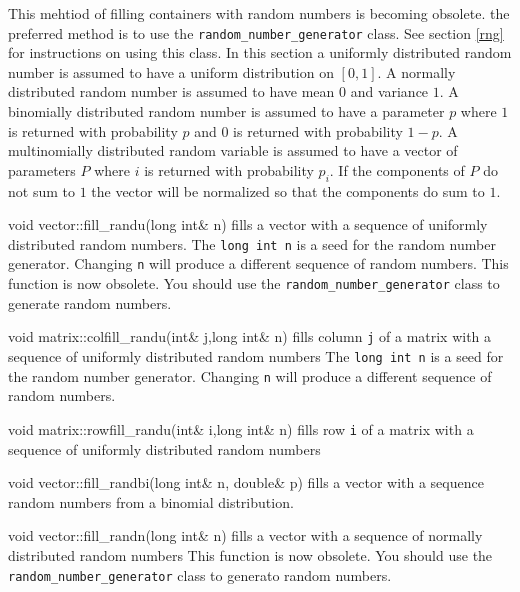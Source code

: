 This mehtiod of filling containers with random numbers is becoming
obsolete. the preferred method is to use the
{\tt random\_number\_generator} class.
See section \ref{rng} for instructions on using this class.
In this section a uniformly distributed random number is assumed to have
a uniform distribution on $[0,1]$. A normally distributed random number
is assumed to have mean $0$ and variance $1$.
A binomially distributed random number is assumed to have a parameter $p$
where $1$ is returned with probability $p$ and $0$ is returned with
probability $1-p$.
A multinomially distributed random variable is assumed to have a vector
of parameters $P$ where $i$ is returned with probability $p_i$.
If the components of $P$ do not sum to $1$ the vector will be normalized
so that the components do sum to $1$.

  
\beginexample
void vector::fill_randu(long int& n)
\endexample
\noindent fills a vector with a sequence of uniformly distributed 
random numbers. The {\tt long int n} is a seed for the random number
generator. Changing {\tt n} will produce a different sequence of
random numbers. 
This function is now obsolete. You should use the
{\tt random\_number\_generator} class to generate random numbers. 

\beginexample
void matrix::colfill_randu(int& j,long int& n)
\endexample
\noindent fills column {\tt j} of a matrix with a sequence of uniformly 
distributed random numbers
The {\tt long int n} is a seed for the random number
generator. Changing {\tt n} will produce a different sequence of
random numbers.

\beginexample
void matrix::rowfill_randu(int& i,long int& n)
\endexample
\noindent fills row {\tt i} of a matrix with a sequence of uniformly 
distributed random numbers

  
\beginexample
void vector::fill_randbi(long int& n, double& p)
\endexample
\noindent fills a vector with a sequence random numbers from
a binomial distribution.

  
\beginexample
void vector::fill_randn(long int& n)
\endexample
\noindent fills a vector with a sequence of normally distributed 
random numbers
This function is now obsolete. You should use the
{\tt random\_number\_generator} class to generato random numbers. 


